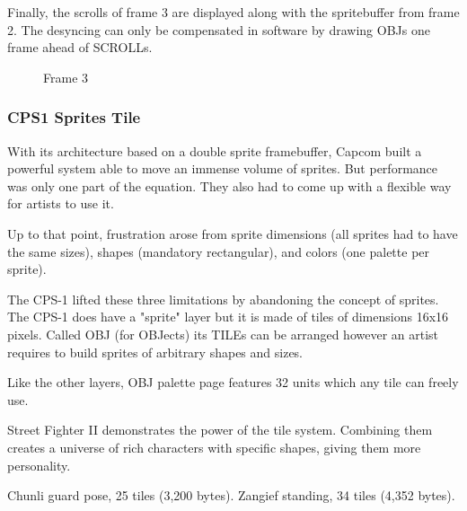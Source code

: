 Finally, the scrolls of frame 3 are displayed along with the spritebuffer from frame 2. The desyncing can only be compensated in software by drawing OBJs one frame ahead of SCROLLs.

\begin{figure}[H]
 \caption*{Frame 3}%
 \end{figure}%





\subsubsection{CPS1 Sprites Tile}
With its architecture based on a double sprite framebuffer, Capcom built a powerful system able to move an immense volume of sprites. But performance was only one part of the equation. They also had to come up with a flexible way for artists to use it.

Up to that point, frustration arose from sprite dimensions (all sprites had to have the same sizes), shapes (mandatory rectangular), and colors (one palette per sprite). 

The CPS-1 lifted these three limitations by abandoning the concept of sprites. The CPS-1 does have a "sprite" layer but it is made of tiles of dimensions 16x16 pixels. Called OBJ (for OBJects) its TILEs can be arranged however an artist requires to build sprites of arbitrary shapes and sizes. 

Like the other layers, OBJ palette page features 32 units which any tile can freely use.

\pagebreak

Street Fighter II demonstrates the power of the tile system. Combining them creates a universe of rich characters with specific shapes, giving them more personality.

\begin{minipage}[t]{0.453\linewidth}
\end{minipage}%
\hfill%
\begin{minipage}[t]{0.53\linewidth}
\end{minipage}


Chunli guard pose, 25 tiles (3,200 bytes). Zangief standing, 34 tiles (4,352 bytes). 

\begin{minipage}[t]{0.3\linewidth}
\end{minipage}%
\hfill%
\begin{minipage}[t]{0.53\linewidth}
\end{minipage}

